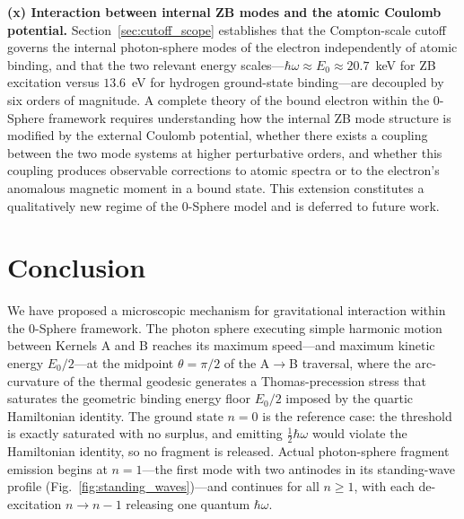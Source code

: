 \documentclass[%
 reprint, amsmath,amssymb, aps, prb, ]{revtex4-2}
\numberwithin{equation}{section}
\begin{document}
\textbf{(x) Interaction between internal ZB modes and the atomic Coulomb potential.} Section~\ref{sec:cutoff_scope} establishes that the Compton-scale cutoff governs the internal photon-sphere modes of the electron independently of atomic binding, and that the two relevant energy scales---$\hbar\omega \approx E_0 \approx 20.7$~keV for ZB excitation versus $13.6$~eV for hydrogen ground-state binding---are decoupled by six orders of magnitude. A complete theory of the bound electron within the 0-Sphere framework requires understanding how the internal ZB mode structure is modified by the external Coulomb potential, whether there exists a coupling between the two mode systems at higher perturbative orders, and whether this coupling produces observable corrections to atomic spectra or to the electron's anomalous magnetic moment in a bound state. This extension constitutes a qualitatively new regime of the 0-Sphere model and is deferred to future work.

\section{Conclusion}
\label{sec:conclusion}

We have proposed a microscopic mechanism for gravitational interaction within the 0-Sphere framework. The photon sphere executing simple harmonic motion between Kernels A and B reaches its maximum speed---and maximum kinetic energy $E_0/2$---at the midpoint $\theta = \pi/2$ of the A$\to$B traversal, where the arc-curvature of the thermal geodesic generates a Thomas-precession stress that saturates the geometric binding energy floor $E_0/2$ imposed by the quartic Hamiltonian identity. The ground state $n=0$ is the reference case: the threshold is exactly saturated with no surplus, and emitting $\tfrac{1}{2}\hbar\omega$ would violate the Hamiltonian identity, so no fragment is released. Actual photon-sphere fragment emission begins at $n=1$---the first mode with two antinodes in its standing-wave profile (Fig.~\ref{fig:standing_waves})---and continues for all $n \geq 1$, with each de-excitation $n \to n-1$ releasing one quantum $\hbar\omega$.
\end{document}
